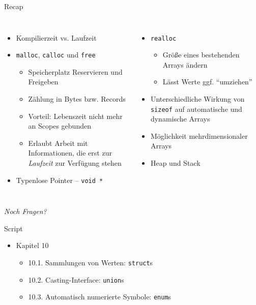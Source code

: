 
\begin{frame}[t,plain]
\titlepage
\end{frame}


\begin{frame}[fragile]{Recap}
%
\begin{columns}[T]
\begin{itemize}
\item Kompilierzeit vs. Laufzeit
\item \texttt{malloc}, \texttt{calloc} und \texttt{free}
	\begin{itemize}
	\item Speicherplatz Reservieren und Freigeben
	\item Zählung in Bytes bzw. Records
	\item Vorteil: Lebenszeit nicht mehr an Scopes gebunden
	\item Erlaubt Arbeit mit Informationen, die erst zur \emph{Laufzeit} zur Verfügung stehen
	\end{itemize}
\item Typenlose Pointer -- \texttt{void *}
\end{itemize}
%
\begin{itemize}
\item \texttt{realloc}
	\begin{itemize}
	\item Größe eines bestehenden Arrays ändern
	\item Lässt Werte ggf. \enquote{umziehen}
	\end{itemize}
\item Unterschiedliche Wirkung von \texttt{sizeof} auf automatische und dynamische Arrays
\item Möglichkeit mehrdimensionaler Arrays
\item Heap und Stack
\end{itemize}
\end{columns}
%
\begin{center}
\emph{Noch Fragen?}
\end{center}
%
\end{frame}


\begin{frame}{Script}
%
\begin{itemize}
\item Kapitel 10
	\begin{itemize}
	\item 10.1. Sammlungen von Werten: \texttt{struct}s
	\item 10.2. Casting-Interface: \texttt{union}s
	\item 10.3. Automatisch numerierte Symbole: \texttt{enum}s
	\end{itemize}
\end{itemize}
%
\end{frame}

